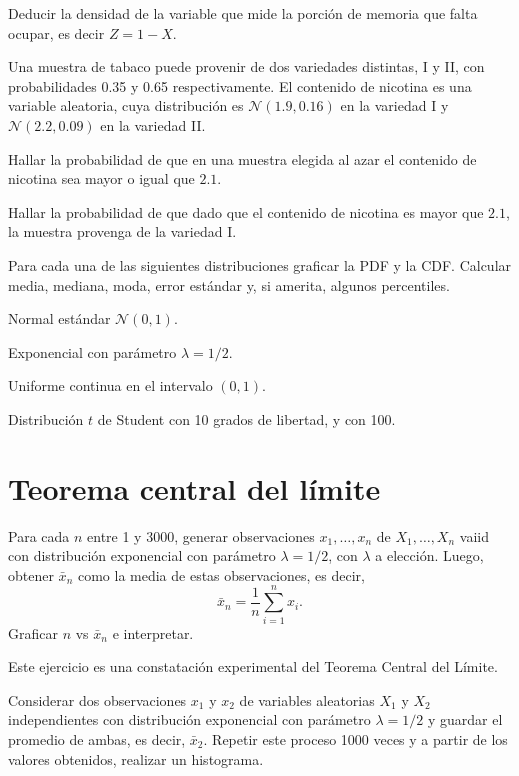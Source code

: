 \documentclass[a4paper,oneside,fleqn,11pt]{article}
\newcommand\N{\mathcal{N}}
\begin{document}
\begin{ejercicios}
\begin{ejitems}
  \item Deducir la densidad de la variable que mide la porción de memoria que
  falta ocupar, es decir $Z = 1 - X$.
\end{ejitems}

\item
Una muestra de tabaco puede provenir de dos variedades distintas, I y II, con
probabilidades 0.35 y 0.65 respectivamente. El contenido de nicotina es una
variable aleatoria, cuya distribución es $\N(1.9, 0.16)$ en la variedad I y
$\N(2.2, 0.09)$ en la variedad II.

\begin{ejitems}
  \item 
  Hallar la probabilidad de que en una muestra elegida al azar el contenido de
  nicotina sea mayor o igual que $2.1$.
  
  \item
  Hallar la probabilidad de que dado que el contenido de nicotina es mayor que
  $2.1$, la muestra provenga de la variedad I.
\end{ejitems}

\item 
Para cada una de las siguientes distribuciones graficar la PDF y la CDF. 
Calcular media, mediana, moda, error estándar y, si amerita, algunos percentiles.
\begin{ejitems}
  \item Normal estándar $\N(0,1)$.
  \item Exponencial con parámetro $\lambda = 1/2$.
  \item Uniforme continua en el intervalo $(0, 1)$.
  \item Distribución $t$ de Student con 10 grados de libertad, y con 100.
\end{ejitems}

\section{Teorema central del límite}

\item Para cada $n$ entre 1 y 3000, generar observaciones $x_1, \ldots, x_n$
de $X_1, \ldots, X_n$ vaiid con distribución exponencial con parámetro
$\lambda = 1/2$, con $\lambda$ a elección. Luego, obtener $\bar x_n$ como la
media de estas observaciones, es decir, 
\[
  \bar x_n = \frac{1}{n} \sum_{i=1}^{n} x_i.
\]
Graficar $n$ vs $\bar x_n $  e interpretar.

\item 
Este ejercicio es una constatación experimental del Teorema Central del
Límite. 
\begin{ejitems}
  \item Considerar dos observaciones $x_1$ y $x_2$ de variables aleatorias $X_1$
  y $X_2$ independientes con distribución exponencial con parámetro
  $\lambda=1/2$ y guardar el promedio de ambas, es decir, $\bar x_2$. 
  Repetir este proceso 1000 veces y a partir de los valores obtenidos, realizar
  un histograma.
  

\end{ejitems}
\end{ejercicios}
\end{document}
